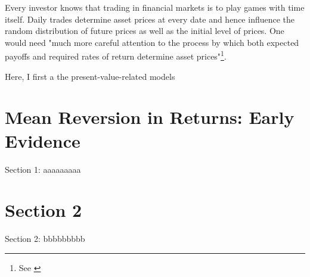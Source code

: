 \minitoc

\vspace{0.5cm}
Every investor knows that trading in financial markets is to play
games with time itself. Daily trades determine asset prices at every date and hence
influence the random distribution of future prices as well as the initial
level of prices. One would need "much more careful attention to the process
by which both expected payoffs and required rates of return determine
asset prices"\footnote{See \cite[p.~121]{campbell2017financial}}.

Here, I first a the present-value-related models 

\section{Mean Reversion in Returns: Early Evidence}
Section 1: aaaaaaaaa

\section{Section 2}
Section 2: bbbbbbbbb